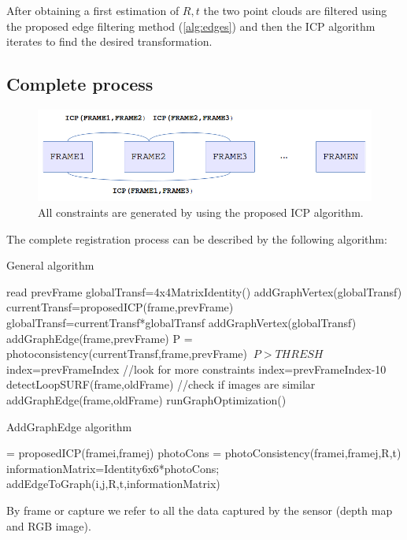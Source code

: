 After obtaining a first estimation of $R,t$ the two point clouds are filtered using the proposed edge 
filtering method (\ref{alg:edges}) and then the ICP algorithm iterates to find the desired transformation.


\subsection{Complete process}

\begin{figure}[!h]
\begin{center}
\includegraphics[scale=0.55]{images/graph_icp}
\caption{All constraints are generated by using the proposed ICP algorithm.}
\end{center}
\end{figure}


The complete registration process can be described by the following algorithm:

\begin{algorithm}[H]
\caption{General algorithm}
\begin{algorithmic}[1]
\State read prevFrame
\State globalTransf=4x4MatrixIdentity()
\State addGraphVertex(globalTransf)
\State currentTransf=proposedICP(frame,prevFrame)
\State globalTransf=currentTransf*globalTransf
\State addGraphVertex(globalTransf)
\State addGraphEdge(frame,prevFrame)
\State P = photoconsistency(currentTransf,frame,prevFrame)
\If $\ P > THRESH$
\State index=prevFrameIndex //look for more constraints
\Else
\State index=prevFrameIndex-10
\EndIf
{} 
\State detectLoopSURF(frame,oldFrame) //check if images are similar
\State addGraphEdge(frame,oldFrame)
\EndIf
\EndFor
\EndWhile
\State runGraphOptimization()
\end{algorithmic}
\end{algorithm}

\begin{algorithm}[H]
\caption{AddGraphEdge algorithm}
\begin{algorithmic}[1]
\State [R,t] = proposedICP(framei,framej)
\State photoCons = photoConsistency(framei,framej,R,t)
\State informationMatrix=Identity6x6*photoCons;
\State addEdgeToGraph(i,j,R,t,informationMatrix)
\end{algorithmic}
\end{algorithm}
By frame or capture we refer to all the data captured by the sensor (depth map and RGB image).


